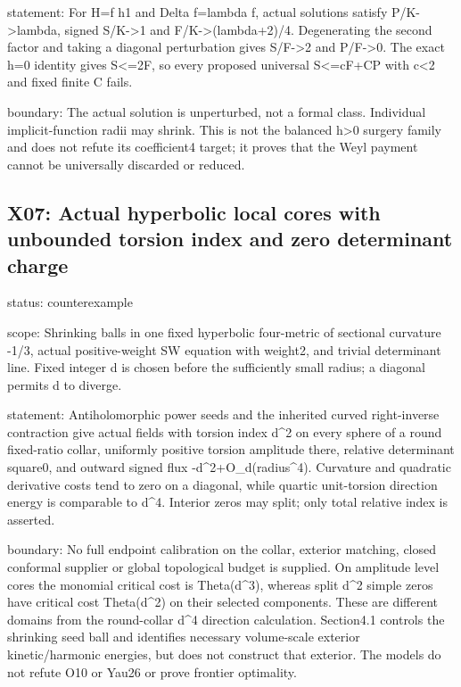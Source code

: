 \documentclass[
  10pt,
]{article}
\begin{document}
statement: For H=f h1 and Delta f=lambda f, actual solutions satisfy
P/K-\textgreater lambda, signed S/K-\textgreater1 and
F/K-\textgreater(lambda+2)/4. Degenerating the second factor and taking
a diagonal perturbation gives S/F-\textgreater2 and P/F-\textgreater0.
The exact h=0 identity gives S\textless=2F, so every proposed universal
S\textless=cF+CP with c\textless2 and fixed finite C fails.

boundary: The actual solution is unperturbed, not a formal class.
Individual implicit-function radii may shrink. This is not the balanced
h\textgreater0 surgery family and does not refute its coefficient4
target; it proves that the Weyl payment cannot be universally discarded
or reduced.

\hypertarget{x07-actual-hyperbolic-local-cores-with-unbounded-torsion-index-and-zero-determinant-charge}{%
\subsection{X07: Actual hyperbolic local cores with unbounded torsion
index and zero determinant
charge}\label{x07-actual-hyperbolic-local-cores-with-unbounded-torsion-index-and-zero-determinant-charge}}

status: counterexample

scope: Shrinking balls in one fixed hyperbolic four-metric of sectional
curvature -1/3, actual positive-weight SW equation with weight2, and
trivial determinant line. Fixed integer d is chosen before the
sufficiently small radius; a diagonal permits d to diverge.

statement: Antiholomorphic power seeds and the inherited curved
right-inverse contraction give actual fields with torsion index d\^{}2
on every sphere of a round fixed-ratio collar, uniformly positive
torsion amplitude there, relative determinant square0, and outward
signed flux -d\^{}2+O\_d(radius\^{}4). Curvature and quadratic
derivative costs tend to zero on a diagonal, while quartic unit-torsion
direction energy is comparable to d\^{}4. Interior zeros may split; only
total relative index is asserted.

boundary: No full endpoint calibration on the collar, exterior matching,
closed conformal supplier or global topological budget is supplied. On
amplitude level cores the monomial critical cost is Theta(d\^{}3),
whereas split d\^{}2 simple zeros have critical cost Theta(d\^{}2) on
their selected components. These are different domains from the
round-collar d\^{}4 direction calculation. Section4.1 controls the
shrinking seed ball and identifies necessary volume-scale exterior
kinetic/harmonic energies, but does not construct that exterior. The
models do not refute O10 or Yau26 or prove frontier optimality.
\end{document}
